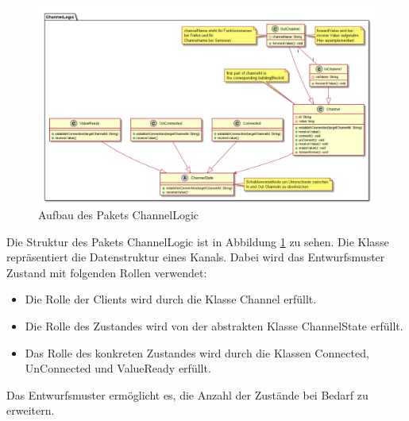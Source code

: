 \documentclass[parskip=full]{scrartcl}
\begin{document}
\begin{figure}[htbp]
	\begin{center}
		\includegraphics[width = 16cm]{Grafiken/ChannelLogic.png}
		\caption{Aufbau des Pakets ChannelLogic}
		\label{ChannelLogic}
	\end{center}
\end{figure}

Die Struktur des Pakets ChannelLogic ist in Abbildung \ref{ChannelLogic} zu sehen. Die Klasse repräsentiert die Datenstruktur eines Kanals. Dabei wird das Entwurfsmuster Zustand mit folgenden Rollen verwendet:
\begin{itemize}

\item Die Rolle der Clients wird durch die Klasse Channel erfüllt.
\item Die Rolle des Zustandes wird von der abstrakten Klasse ChannelState erfüllt.
\item Das Rolle des konkreten Zustandes wird durch die Klassen Connected, UnConnected und ValueReady erfüllt.

\end{itemize}

Das Entwurfsmuster ermöglicht es, die Anzahl der Zustände bei Bedarf zu erweitern.
\end{document}
